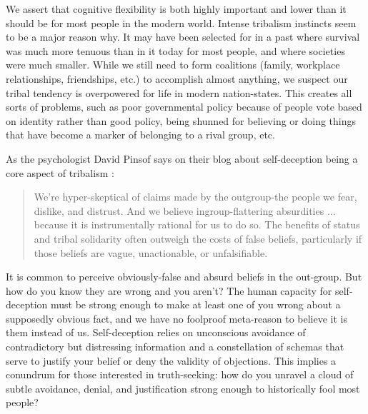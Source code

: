 \documentclass[12pt,letterpaper]{book}
\begin{document}
We assert that cognitive flexibility is both highly important and lower than it should be for most people in the modern world. Intense tribalism instincts seem to be a major reason why. It may have been selected for in a past where survival was much more tenuous than in it today for most people, and where societies were much smaller. While we still need to form coalitions (family, workplace relationships, friendships, etc.) to accomplish almost anything, we suspect our tribal tendency is overpowered for life in modern nation-states. This creates all sorts of problems, such as poor governmental policy because of people vote based on identity \cite{klein2020Polarized} rather than good policy, being shunned for believing or doing things that have become a marker of belonging to a rival group, etc.

As the psychologist David Pinsof says on their blog about self-deception being a core aspect of tribalism \cite{pinsof2024Truth}:
\begin{quotation}
	We're hyper-skeptical of claims made by the outgroup-the people we fear, dislike, and distrust. And we believe ingroup-flattering absurdities ... because it is instrumentally rational for us to do so. The benefits of status and tribal solidarity often outweigh the costs of false beliefs, particularly if those beliefs are vague, unactionable, or unfalsifiable.
\end{quotation}

It is common to perceive obviously-false and absurd beliefs in the out-group. But how do you know they are wrong and you aren't? The human capacity for self-deception must be strong enough to make at least one of you wrong about a supposedly obvious fact, and we have no foolproof meta-reason to believe it is them instead of us. Self-deception relies on unconscious avoidance of contradictory but distressing information and a constellation of schemas that serve to justify your belief or deny the validity of objections. This implies a conundrum for those interested in truth-seeking: how do you unravel a cloud of subtle avoidance, denial, and justification strong enough to historically fool most people?
\end{document}
